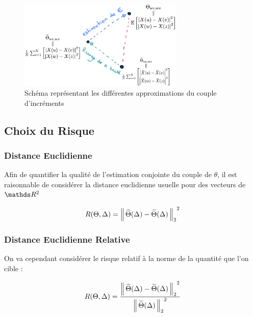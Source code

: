 \begin{figure}[H]
	\centering
	\includegraphics[width=0.7\textwidth]{Images/sketches/theta_biais.png}
	\caption{Schéma représentant les différentes approximations du couple d'incréments}
	\label{fig:sketch_theta_biais}
\end{figure}

\subsection{Choix du Risque}
\label{annexe:choix-du-rique}

\subsubsection{Distance Euclidienne}

Afin de quantifier la qualité de l'estimation conjointe du couple de $\theta$, il est raisonnable de considérer la distance euclidienne usuelle pour des vecteurs de $\R 2$

\begin{equation*}
R(\Theta, \Delta) = {\distnorme 2 {\widehat \Theta(\Delta)} {\widetilde \Theta(\Delta)}}^2
\end{equation*}


\subsubsection{Distance Euclidienne Relative}

On va cependant considérer le risque relatif à la norme de la quantité que l'on cible :

\begin{equation*}
R(\Theta, \Delta) =\frac{ {\distnorme 2 {\widehat \Theta(\Delta)} {\widetilde \Theta(\Delta)}}^2}{ {\norme 2 {\widetilde \Theta(\Delta)}}^2 }
\end{equation*}

